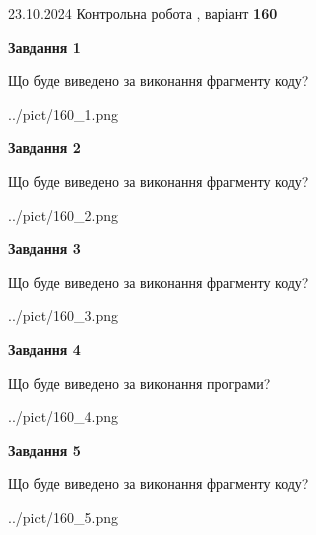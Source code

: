 \documentclass[12pt, ukrainian]{article}
\begin{document}
{\Large{23.10.2024 Контрольна робота , варіант  \No \textbf { 160 }\par}}
{
\begin {large}
{\begin {center}\textbf{Завдання 1}\end {center}}

Що буде виведено за виконання фрагменту коду?\par
\begin{center}
	{../pict/160_1.png}
\end{center}
\newpage

{\begin {center}\textbf{Завдання 2}\end {center}}

Що буде виведено за виконання фрагменту коду?\par
\begin{center}
	{../pict/160_2.png}
\end{center}
\newpage

{\begin {center}\textbf{Завдання 3}\end {center}}

Що буде виведено за виконання фрагменту коду?\par
\begin{center}
	{../pict/160_3.png}
\end{center}
\newpage

{\begin {center}\textbf{Завдання 4}\end {center}}

Що буде виведено за виконання програми?\par
\begin{center}
	{../pict/160_4.png}
\end{center}
\newpage

{\begin {center}\textbf{Завдання 5}\end {center}}

Що буде виведено за виконання фрагменту коду?\par
\begin{center}
	{../pict/160_5.png}
\end{center}
\newpage


\end{large}}
\end{document}
